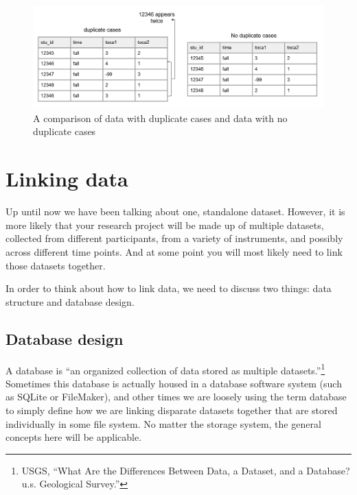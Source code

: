 \documentclass[
]{book}
\begin{document}
\begin{figure}

{\centering \includegraphics[width=1\linewidth]{img/duplicate} 

}

\caption{A comparison of data with duplicate cases and data with no duplicate cases}\label{fig:unnamed-chunk-8}
\end{figure}

\hypertarget{linking-data}{%
\section{Linking data}\label{linking-data}}

Up until now we have been talking about one, standalone dataset. However, it is more likely that your research project will be made up of multiple datasets, collected from different participants, from a variety of instruments, and possibly across different time points. And at some point you will most likely need to link those datasets together.

In order to think about how to link data, we need to discuss two things: data structure and database design.

\hypertarget{database-design}{%
\subsection{Database design}\label{database-design}}

A database is ``an organized collection of data stored as multiple datasets.''\footnote{USGS, {``What Are the Differences Between Data, a Dataset, and a Database? {\textbar} u.s. Geological Survey.''}} Sometimes this database is actually housed in a database software system (such as SQLite or FileMaker), and other times we are loosely using the term database to simply define how we are linking disparate datasets together that are stored individually in some file system. No matter the storage system, the general concepts here will be applicable.
\end{document}
